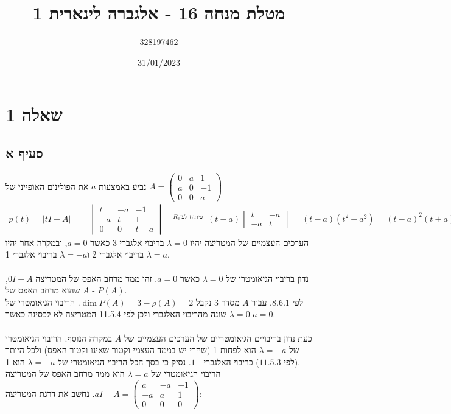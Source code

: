 \documentclass{article}
\title{מטלת מנחה 16 - אלגברה לינארית 1}
\author{328197462}
\date{31/01/2023}
\DeclareMathOperator*{\equals}{=}
\begin{document}
\maketitle

\section*{שאלה 1}

\subsection*{סעיף א}

נביע באמצעות $a$ את הפולינום האופייני של $A=\begin{pmatrix}
        0 & a & 1  \\
        a & 0 & -1 \\
        0 & 0 & a
    \end{pmatrix}$
\begin{align*}
    p(t)=|tI-A| & =\begin{vmatrix}
        t  & -a & -1  \\
        -a & t  & 1   \\
        0  & 0  & t-a
    \end{vmatrix}\equals^{R_3\text{פיתוח לפי }}
    (t-a)\begin{vmatrix}
        t  & -a \\
        -a & t
    \end{vmatrix}=
    (t-a)(t^2-a^2)=
    (t-a)^2(t+a)
\end{align*}
הערכים העצמיים של המטריצה יהיו $\lambda=0$ בריבוי אלגברי 3 כאשר $a=0$, ובמקרה אחר יהיו $\lambda=a$ בריבוי אלגברי 2 ו$\lambda=-a$ בריבוי אלגברי 1.
\\\\
נדון בריבוי הגיאומטרי של $\lambda=0$ כאשר $a=0$. זהו ממד מרחב האפס של המטריצה $0I-A$, שהוא מרחב האפס של $A$ - $P(A)$. \\
לפי $8.6.1$, עבור $A$ מסדר 3 נקבל $\dim P(A)=3-\rho(A)=2$. הריבוי הגיאומטרי של $\lambda=0$ שונה מהריבוי האלגברי ולכן לפי 11.5.4 המטריצה לא לכסינה כאשר $a=0$.
\\\\
כעת נדון בריבויים הגיאומטריים של הערכים העצמיים של $A$ במקרה הנוסף. הריבוי הגיאומטרי של $\lambda=-a$ הוא לפחות 1 (שהרי יש בממד העצמי וקטור שאינו וקטור האפס) ולכל היותר (לפי  $11.5.3$) כריבוי האלגברי - $1$. נסיק כי בסך הכל הריבוי הגיאומטרי של $\lambda=-a$ הוא 1.\\
הריבוי הגיאומטרי של $\lambda=a$ הוא ממד מרחב האפס של המטריצה $aI-A=\begin{pmatrix}
        a  & -a & -1 \\
        -a & a  & 1  \\
        0  & 0  & 0
    \end{pmatrix}$. נחשב את דרגת המטריצה:
\end{document}
